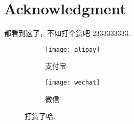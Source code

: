 
\chapter{Acknowledgment}

都看到这了，不如打个赏吧 2333333333.
\begin{figure}[htp]
    \centering
    \begin{subfigure}{0.49\textwidth}
      \texttt{[image: alipay]}
      \caption{支付宝}
    \end{subfigure}
    \begin{subfigure}{0.49\textwidth}
      \texttt{[image: wechat]}
      \caption{微信}
    \end{subfigure}
    \caption*{打赏了哈.}
    \label{figure: pay}
\end{figure}

